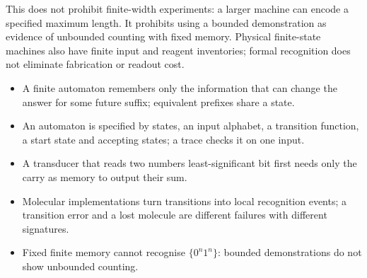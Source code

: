 This does not prohibit finite-width experiments: a larger machine can encode
a specified maximum length. It prohibits using a bounded demonstration as
evidence of unbounded counting with fixed memory. Physical finite-state
machines also have finite input and reagent inventories; formal recognition
does not eliminate fabrication or readout cost.

\begin{KeyIdeas}
\begin{itemize}\setlength{\itemsep}{2pt}
\item A finite automaton remembers only the information that can change the
answer for some future suffix; equivalent prefixes share a state.
\item An automaton is specified by states, an input alphabet, a transition
function, a start state and accepting states; a trace checks it on one input.
\item A transducer that reads two numbers least-significant bit first needs only
the carry as memory to output their sum.
\item Molecular implementations turn transitions into local recognition events;
a transition error and a lost molecule are different failures with different
signatures.
\item Fixed finite memory cannot recognise $\{0^n1^n\}$: bounded demonstrations do
not show unbounded counting.
\end{itemize}
\end{KeyIdeas}

